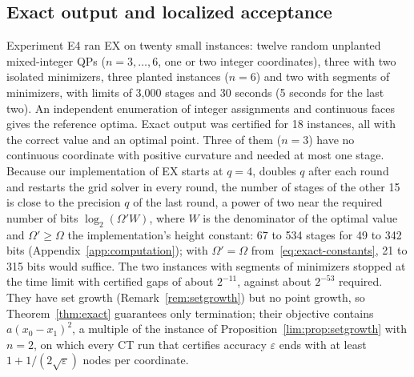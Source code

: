 \subsection{Exact output and localized acceptance}\label{sec:comp-exact}
Experiment E4 ran EX on twenty small instances: twelve random unplanted
mixed-integer QPs ($n=3,\dots,6$, one or two integer coordinates), three with
two isolated minimizers, three planted instances ($n=6$) and two with segments
of minimizers, with limits of 3{,}000 stages and 30 seconds (5 seconds for the
last two). An independent enumeration of integer assignments and continuous
faces gives the reference optima. Exact output was certified for 18
instances, all with the correct value and an optimal point. Three of them
($n=3$) have no continuous coordinate with positive curvature and needed at
most one stage. Because our implementation of EX starts at $q=4$, doubles $q$
after each round and restarts the grid solver in every round,
the number of stages of the other 15 is close to the precision $q$ of the
last round, a power of two near the required number of bits
$\log_2(\Omega'W)$, where $W$ is the denominator of the optimal value and
$\Omega'\ge\Omega$ the implementation's height constant: 67 to 534 stages for
49 to 342 bits (Appendix~\ref{app:computation}); with $\Omega'=\Omega$
from~\eqref{eq:exact-constants}, 21 to 315 bits would suffice. The two instances with
segments of minimizers stopped at the time limit with certified gaps of about
$2^{-11}$, against about $2^{-53}$ required. They have set growth
(Remark~\ref{rem:setgrowth}) but no point growth, so Theorem~\ref{thm:exact}
guarantees only termination; their objective contains $a(x_0-x_1)^2$, a
multiple of the instance of Proposition~\ref{lim:prop:setgrowth} with $n=2$,
on which every CT run that certifies accuracy $\varepsilon$ ends with at least
$1+1/(2\sqrt\varepsilon)$ nodes per coordinate.

